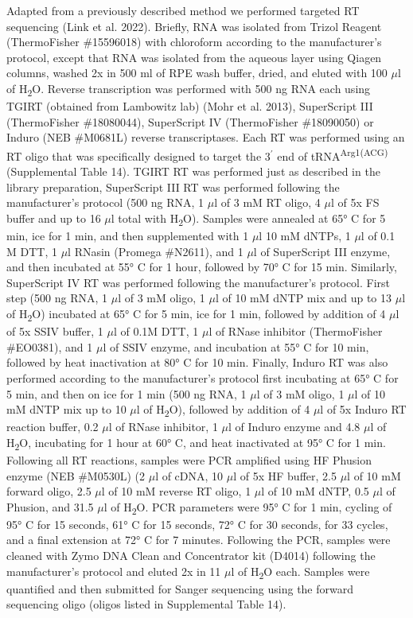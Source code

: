 \documentclass[times, twoside]{zHenriquesLab-StyleBioRxiv}
\begin{document}
Adapted from a previously described method we performed targeted RT sequencing (Link et al. 2022). Briefly, RNA was isolated from Trizol Reagent (ThermoFisher \#15596018) with chloroform according to the manufacturer’s protocol, except that RNA was isolated from the aqueous layer using Qiagen columns, washed 2x in 500 ml of RPE wash buffer, dried, and eluted with 100 \(\mu\)l of H\textsubscript{2}O. Reverse transcription was performed with 500 ng RNA each using TGIRT (obtained from Lambowitz lab) (Mohr et al. 2013), SuperScript III (ThermoFisher \#18080044), SuperScript IV (ThermoFisher \#18090050) or Induro (NEB \#M0681L) reverse transcriptases. Each RT was performed using an RT oligo that was specifically designed to target the 3\(^{\prime}\) end of tRNA\textsuperscript{Arg1(ACG)} (Supplemental Table 14). TGIRT RT was performed just as described in the library preparation, SuperScript III RT was performed following the manufacturer’s protocol (500 ng RNA, 1 \(\mu\)l of 3 mM RT oligo, 4 \(\mu\)l of 5x FS buffer and up to 16 \(\mu\)l total with H\textsubscript{2}O). Samples were annealed at 65° C for 5 min, ice for 1 min, and then supplemented with 1 \(\mu\)l 10 mM dNTPs, 1 \(\mu\)l of 0.1 M DTT, 1 \(\mu\)l RNasin (Promega \#N2611), and 1 \(\mu\)l of SuperScript III enzyme, and then incubated at 55° C for 1 hour, followed by 70° C for 15 min. Similarly, SuperScript IV RT was performed following the manufacturer’s protocol. First step (500 ng RNA, 1 \(\mu\)l of 3 mM oligo, 1 \(\mu\)l of 10 mM dNTP mix and up to 13 \(\mu\)l of H\textsubscript{2}O) incubated at 65° C for 5 min, ice for 1 min, followed by addition of 4 \(\mu\)l of 5x SSIV buffer, 1 \(\mu\)l of 0.1M DTT, 1 \(\mu\)l of RNase inhibitor (ThermoFisher \#EO0381), and 1 \(\mu\)l of SSIV enzyme, and incubation at 55° C for 10 min, followed by heat inactivation at 80° C for 10 min. Finally, Induro RT was also performed according to the manufacturer’s protocol first incubating at 65° C for 5 min, and then on ice for 1 min (500 ng RNA, 1 \(\mu\)l of 3 mM oligo, 1 \(\mu\)l of 10 mM dNTP mix up to 10 \(\mu\)l of H\textsubscript{2}O), followed by addition of 4 \(\mu\)l of 5x Induro RT reaction buffer, 0.2 \(\mu\)l of RNase inhibitor, 1 \(\mu\)l of Induro enzyme and 4.8 \(\mu\)l of H\textsubscript{2}O, incubating for 1 hour at 60° C, and heat inactivated at 95° C for 1 min. Following all RT reactions, samples were PCR amplified using HF Phusion enzyme (NEB \#M0530L) (2 \(\mu\)l of cDNA, 10 \(\mu\)l of 5x HF buffer, 2.5 \(\mu\)l of 10 mM forward oligo, 2.5 \(\mu\)l of 10 mM reverse RT oligo, 1 \(\mu\)l of 10 mM dNTP, 0.5 \(\mu\)l of Phusion, and 31.5 \(\mu\)l of H\textsubscript{2}O. PCR parameters were 95° C for 1 min, cycling of 95° C for 15 seconds, 61° C for 15 seconds, 72° C for 30 seconds, for 33 cycles, and a final extension at 72° C for 7 minutes. Following the PCR, samples were cleaned with Zymo DNA Clean and Concentrator kit (D4014) following the manufacturer’s protocol and eluted 2x in 11 \(\mu\)l of H\textsubscript{2}O each. Samples were quantified and then submitted for Sanger sequencing using the forward sequencing oligo (oligos listed in Supplemental Table 14). 
\end{document}
